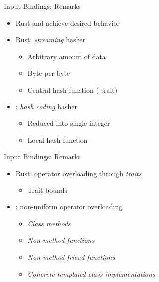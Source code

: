 \begin{frame}[t]{Input Bindings: Remarks}

    \begin{itemize}
        \itemsep.3em

        \item Rust and \cpp achieve desired behavior

        \item Rust: \textit{streaming} hasher
            \begin{itemize}
                \item Arbitrary amount of data
                \item Byte-per-byte
                \item Central hash function ( trait)
            \end{itemize}

        \item \cpp: \textit{hash coding} hasher
            \begin{itemize}
                \item Reduced into single integer
                \item Local hash function
            \end{itemize}

    \end{itemize}

    \vfill

\end{frame}

\begin{frame}[t]{Input Bindings: Remarks}

    \begin{itemize}
        \itemsep.3em

        \item Rust: operator overloading through \textit{traits}
            \begin{itemize}
                \item Trait bounds
            \end{itemize}

        \item \cpp: non-uniform operator overloading
            \begin{itemize}
                \item \textit{Class methods}
                \item \textit{Non-method functions}
                \item \textit{Non-method friend functions}
                \item \textit{Concrete templated class implementations}
            \end{itemize}

    \end{itemize}

    \vfill

\end{frame}
